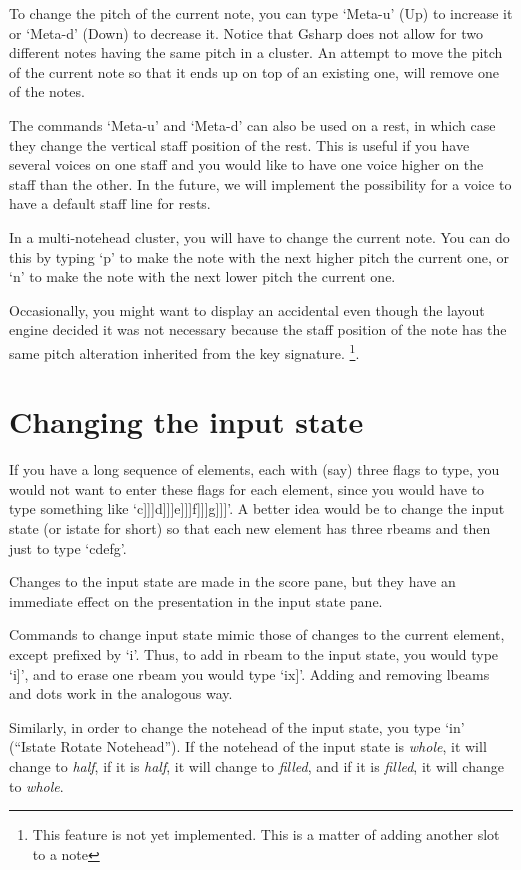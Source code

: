 \documentclass[11pt]{book}
\def\gs{Gsharp}
\def\unimp#1{\footnote{This feature is not yet implemented.  #1}}
\def\kbd#1{`#1'}
\def\command#1{``#1''}
\begin{document}
To change the pitch of the current note, you can type \kbd{Meta-u}
(Up) to increase it or \kbd{Meta-d} (Down) to decrease it.  Notice
that {\gs} does not allow for two different notes having the same
pitch in a cluster.  An attempt to move the pitch of the current note
so that it ends up on top of an existing one, will remove one of the
notes.

The commands \kbd{Meta-u} and \kbd{Meta-d} can also be used on a rest,
in which case they change the vertical staff position of the rest.
This is useful if you have several voices on one staff and you would
like to have one voice higher on the staff than the other.  In the
future, we will implement the possibility for a voice to have a
default staff line for rests. 

In a multi-notehead cluster, you will have to change the current
note.  You can do this by typing \kbd{p} to make the note with the next
higher pitch the current one, or \kbd{n} to make the note with the
next lower pitch the current one.  

Occasionally, you might want to display an accidental even though the
layout engine decided it was not necessary because the staff position
of the note has the same pitch alteration inherited from the key
signature.  \unimp{This is a matter of adding another slot to a
note}. 

\chapter{Changing the input state}

If you have a long sequence of elements, each with (say) three flags
to type, you would not want to enter these flags for each element,
since you would have to type something like
\kbd{c]]]d]]]e]]]f]]]g]]]}.  A better idea would be to change the
input state (or istate for short) so that each new element has three
rbeams and then just to type \kbd{cdefg}.

Changes to the input state are made in the score pane, but they have
an immediate effect on the presentation in the input state pane. 

Commands to change input state mimic those of changes to the current
element, except prefixed by \kbd{i}.  Thus, to add in rbeam to the
input state, you would type \kbd{i]}, and to erase one rbeam you would
  type \kbd{ix]}.  Adding and removing lbeams and dots work in the
    analogous way. 

Similarly, in order to change the notehead of the input state, you
type \kbd{in} (\command{Istate Rotate Notehead}).  If the notehead of
the input state is \emph{whole}, it will change to \emph{half}, if
it is \emph{half}, it will change to \emph{filled}, and if it is
\emph{filled}, it will change to \emph{whole}.
\end{document}
